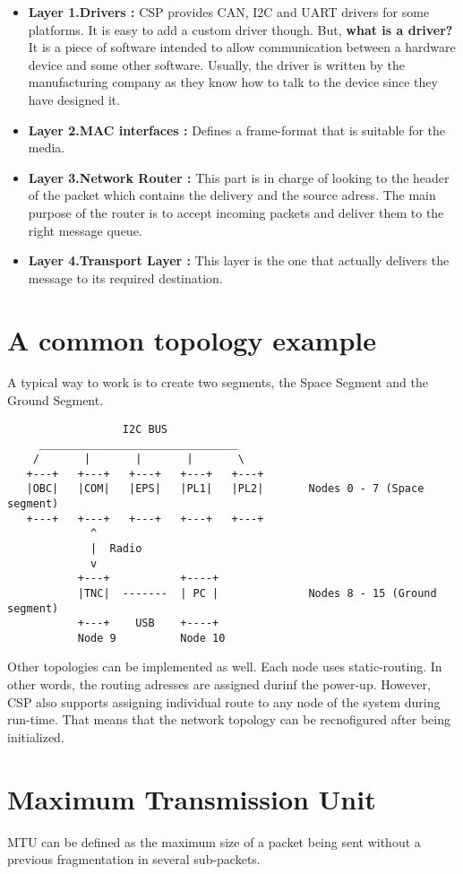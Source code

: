 \begin{itemize}
	\item \textbf{Layer 1.Drivers :} 
	CSP provides CAN, I2C and UART drivers for some platforms. It is easy to add a custom driver though. But, \textbf{what is a driver?} It is a piece of software intended to allow communication between a hardware device and some other software. Usually, the driver is written by the manufacturing company as they know how to talk to the device since they have designed it.
	\item \textbf{Layer 2.MAC interfaces :} Defines a frame-format that is suitable for the media. 
	\item \textbf{Layer 3.Network Router :} This part is in charge of looking to the header of the packet which contains the delivery and the source adress. The main purpose of the router is to accept incoming packets and deliver them to the right message queue. 
	\item \textbf{Layer 4.Transport Layer :} This layer is the one that actually delivers the message to its required destination.
\end{itemize}

\section{ A common topology example}
 A typical way to work is to create two segments, the Space Segment and the Ground Segment.
 
 \begin{verbatim}
                  I2C BUS
     _______________________________
    /       |       |       |       \
   +---+   +---+   +---+   +---+   +---+
   |OBC|   |COM|   |EPS|   |PL1|   |PL2|       Nodes 0 - 7 (Space segment)
   +---+   +---+   +---+   +---+   +---+
             ^
             |  Radio
             v
           +---+           +----+
           |TNC|  -------  | PC |              Nodes 8 - 15 (Ground segment)
           +---+    USB    +----+
           Node 9          Node 10
 \end{verbatim}

Other topologies can be implemented as well.
Each node uses static-routing. In other words, the routing adresses are assigned durinf the power-up. However, CSP also supports assigning individual route to any node of the system during run-time. That means that the network topology can be recnofigured after being initialized.

\section{Maximum Transmission Unit}
MTU can be defined as the maximum size of a packet being sent without a previous fragmentation in several sub-packets.

